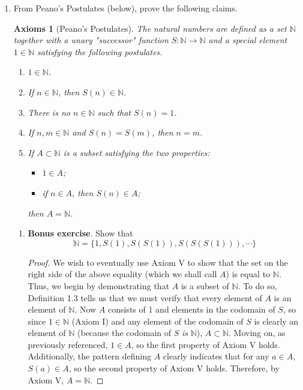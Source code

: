 \documentclass[titlepage]{article}
\newtheorem*{axioms}{Axioms}
\theoremstyle{definition}
\newcommand{\N}{\mathbb{N}}
\begin{document}
\begin{enumerate}
\begin{proof}
\begin{align*}
            &= \sum_{k=0}^{n+1}\binom{n+1}{k}x^{(n+1)-k}y^k
        \end{align*}
        This closes the induction.
    \end{proof}
    \item From Peano's Postulates (below), prove the following claims.
    \begin{axioms}[Peano's Postulates]
        The natural numbers are defined as a set $\N$ together with a unary "successor" function $S:\N\to\N$ and a special element $1\in\N$ satisfying the following postulates.
        \begin{enumerate}[label={\Roman*.}]
            \item $1\in\N$.
            \item If $n\in\N$, then $S(n)\in\N$.
            \item There is no $n\in\N$ such that $S(n)=1$.
            \item If $n,m\in\N$ and $S(n)=S(m)$, then $n=m$.
            \item If $A\subset\N$ is a subset satisfying the two properties:
            \begin{itemize}
                \item $1\in A$;
                \item if $n\in A$, then $S(n)\in A$;
            \end{itemize}
            then $A=\N$.
        \end{enumerate}
    \end{axioms}
    \begin{enumerate}[label={(\alph*)}]
        \item \textbf{Bonus exercise}. Show that
        \begin{equation*}
            \N = \{1,S(1),S(S(1)),S(S(S(1))),\cdots\}
        \end{equation*}
        \begin{proof}
            We wish to eventually use Axiom V to show that the set on the right side of the above equality (which we shall call $A$) is equal to $\N$. Thus, we begin by demonstrating that $A$ is a subset of $\N$. To do so, Definition 1.3 tells us that we must verify that every element of $A$ is an element of $\N$. Now $A$ consists of 1 and elements in the codomain of $S$, so since $1\in\N$ (Axiom I) and any element of the codomain of $S$ is clearly an element of $\N$ (because the codomain of $S$ \emph{is} $\N$), $A\subset\N$. Moving on, as previously referenced, $1\in A$, so the first property of Axiom V holds. Additionally, the pattern defining $A$ clearly indicates that for any $a\in A$, $S(a)\in A$, so the second property of Axiom V holds. Therefore, by Axiom V, $A=\N$.

\end{proof}
\end{enumerate}
\end{enumerate}
\end{document}
